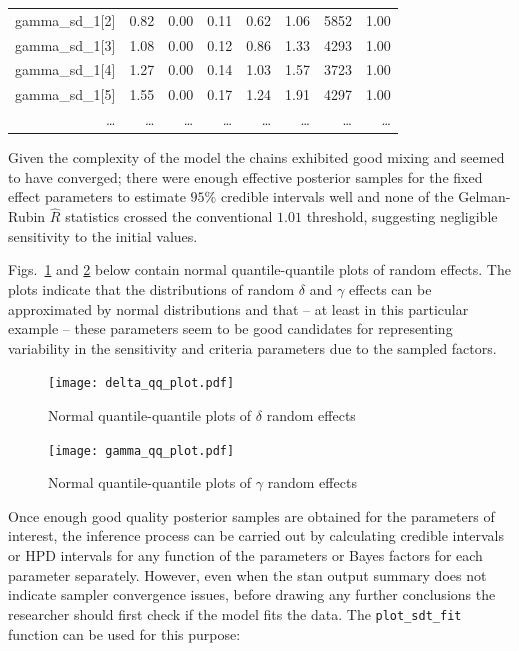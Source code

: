 \documentclass[a4paper,man,apacite,floatsintext]{apa6}
\newcommand{\code}[1]{\texttt{#1}}
\begin{document}
\begin{table}[H]
\begin{tabular}{rrrrrrrr}
  gamma\_sd\_1[2] & 0.82 & 0.00 & 0.11 & 0.62 & 1.06 & 5852 & 1.00 \\ 
  gamma\_sd\_1[3] & 1.08 & 0.00 & 0.12 & 0.86 & 1.33 & 4293 & 1.00 \\ 
  gamma\_sd\_1[4] & 1.27 & 0.00 & 0.14 & 1.03 & 1.57 & 3723 & 1.00 \\ 
  gamma\_sd\_1[5] & 1.55 & 0.00 & 0.17 & 1.24 & 1.91 & 4297 & 1.00 \\ 
  \dots{} & \dots{} & \dots{} & \dots{} & \dots{} & \dots{} & \dots{} & \dots{} \\
  \hline
\end{tabular}
\label{fitsum}
\end{table}

Given the complexity of the model the chains exhibited good mixing and
seemed to have converged; there were enough effective posterior
samples for the fixed effect parameters to estimate $95\%$ credible
intervals well and none of the Gelman-Rubin $\hat{R}$ statistics
crossed the conventional $1.01$ threshold, suggesting negligible
sensitivity to the initial values.

Figs.~\ref{fig:6} and \ref{fig:7} below contain normal
quantile-quantile plots of random effects. The plots indicate that the
distributions of random $\delta$ and $\gamma$ effects can be
approximated by normal distributions and that -- at least in this
particular example -- these parameters seem to be good candidates for
representing variability in the sensitivity and criteria parameters
due to the sampled factors.

\begin{figure}[H]
  \centering
  \texttt{[image: delta\_qq\_plot.pdf]}
  \caption{Normal quantile-quantile plots of $\delta$ random effects}
  \label{fig:6}
\end{figure}

\begin{figure}[H]
  \centering
  \texttt{[image: gamma\_qq\_plot.pdf]}
  \caption{Normal quantile-quantile plots of $\gamma$ random effects}
  \label{fig:7}
\end{figure}

Once enough good quality posterior samples are obtained for the
parameters of interest, the inference process can be carried out by
calculating credible intervals or HPD intervals for any function of
the parameters or Bayes factors for each parameter
separately. However, even when the stan output summary does not
indicate sampler convergence issues, before drawing any further
conclusions the researcher should first check if the model fits the
data. The \code{plot\_sdt\_fit} function can be used for this purpose:
\end{document}
